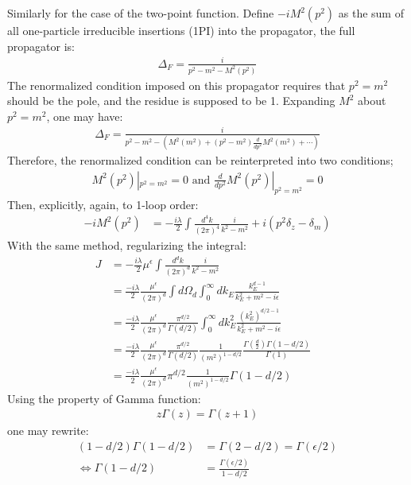 \documentclass[fleqn]{article}
\begin{document}
Similarly for the case of the two-point function. Define $-iM^{2}(p^{2})$ as the sum of all one-particle irreducible insertions (1PI) into the propagator, the full propagator is:
\begin{align}
\Delta_{F} = \frac{i}{p^{2} - m^{2} -M^{2}(p^{2})}
\end{align}
The renormalized condition imposed on this propagator requires that $p^{2} = m^{2}$ should be the pole, and the residue is supposed to be 1. Expanding $M^{2}$ about $p^{2} = m^{2}$, one may have:
\begin{align}
\Delta_{F} = \frac{i}{p^{2} - m^{2} - (M^{2}(m^{2}) + (p^{2} - m^{2})\frac{d}{dp^{2}}M^{2}(m^{2}) + \cdots)}
\end{align}
Therefore, the renormalized condition can be reinterpreted into two conditions;
\begin{align}
M^{2}(p^{2})|_{p^{2} = m^{2}} = 0 \text{       and      } \frac{d}{dp^{2}}M^{2}(p^{2})|_{p^{2} = m^{2}} = 0
\end{align}
Then, explicitly, again, to 1-loop order:
\begin{align}
-iM^{2}(p^{2}) &= -\frac{i\lambda}{2}\int\frac{d^{4}k}{(2\pi)^{4}}\frac{i}{k^{2}-m^{2}}+ i(p^{2} \delta_{z} - \delta_{m})
\end{align}
With the same method, regularizing the integral:
\begin{align}
J&= -\frac{i\lambda}{2}\mu^{\epsilon}\int\frac{d^{d}k}{(2\pi)^{d}} \frac{i}{k^{2} - m^{2}} & \nonumber \\
&= \frac{-i\lambda}{2}\frac{\mu^{\epsilon}}{(2\pi)^{d}} \int d\Omega_{d} \int_{0}^{\infty} dk_{E}\frac{k_{E}^{d-1}}{k_{E}^{2} + m^{2} -i\epsilon}& \nonumber \\
& =  \frac{-i\lambda}{2}\frac{\mu^{\epsilon}}{(2\pi)^{d}} \frac{\pi^{d/2}}{\Gamma(d/2)} \int_{0}^{\infty} dk_{E}^{2} \frac{(k_{E}^{2})^{d/2 -1}}{k_{E}^{2} + m^{2} -i\epsilon} \nonumber \\
& = \frac{-i\lambda}{2}\frac{\mu^{\epsilon}}{(2\pi)^{d}}\frac{\pi^{d/2}}{\Gamma(d/2)} \frac{1}{(m^{2})^{1-d/2}} \frac{\Gamma(\frac{d}{2})\Gamma(1-d/2)}{\Gamma(1)} \nonumber \\
& = \frac{-i\lambda}{2}\frac{\mu^{\epsilon}}{(2\pi)^{d}}\pi^{d/2} \frac{1}{(m^{2})^{1-d/2}}\Gamma(1-d/2)
\end{align}
Using the property of Gamma function:
\begin{align}
z\Gamma(z) = \Gamma(z+1)
\end{align}
one may rewrite:
\begin{align}
(1-d/2)\Gamma(1-d/2) &= \Gamma(2-d/2) = \Gamma(\epsilon / 2) \nonumber \\
\Leftrightarrow \Gamma(1-d/2) &= \frac{\Gamma(\epsilon/2)}{1-d/2}
\end{align}
\end{document}
